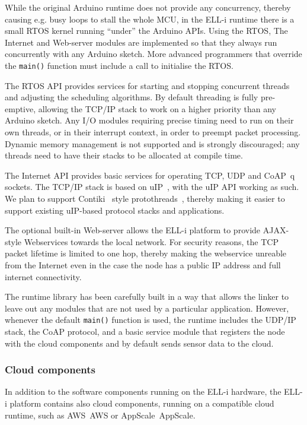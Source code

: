 \documentclass[draft,a4paper]{siamltex}
\begin{document}
While the original Arduino runtime does not provide any concurrency,
thereby causing e.g. busy loops to stall the whole MCU, in the ELL-i
runtime there is a small RTOS kernel running ``under'' the Arduino
APIs.  Using the RTOS, The Internet and Web-server modules are
implemented so that they always run concurrently with any Arduino
sketch.  More advanced programmers that override the \hbox{\tt main()}
function must include a call to initialise the RTOS.

The RTOS API provides services for starting and stopping concurrent
threads and adjusting the scheduling algorithms.  By default threading
is fully pre-emptive, allowing the TCP/IP stack to work on a higher
priority than any Arduino sketch.  Any I/O modules requiring precise
timing need to run on their own threads, or in their interrupt
context, in order to preempt packet processing.  Dynamic memory
management is not supported and is strongly discouraged; any threads
need to have their stacks to be allocated at compile time.

The Internet API provides basic services for operating TCP, UDP and
CoAP~\cite{CoAP}q sockets.  The TCP/IP stack is based on
uIP~\cite{uIP}, with the
uIP API working as such.  We plan to support Contiki~\cite{Contiki}
style protothreads~\cite{protothreads}, thereby making it easier to
support existing uIP-based protocol stacks and applications.

The optional built-in Web-server allows the ELL-i platform to provide
AJAX-style Webservices towards the local network.  For security
reasons, the TCP packet lifetime is limited to one hop, thereby making
the webservice unreable from the Internet even in the case the node
has a public IP address and full internet connectivity.

The runtime library has been carefully built in a way that allows the
linker to leave out any modules that are not used by a particular
application.  However, whenever the default \hbox{\tt main()} function
is used, the runtime includes the UDP/IP stack, the CoAP protocol, and
a basic service module that registers the node with the cloud
components and by default sends sensor data to the cloud.

\subsubsection{Cloud components}

In addition to the software components running on the ELL-i hardware,
the ELL-i platform contains also cloud components, running on a
compatible cloud runtime, such as AWS~{AWS} or AppScale~{AppScale}.
\end{document}
